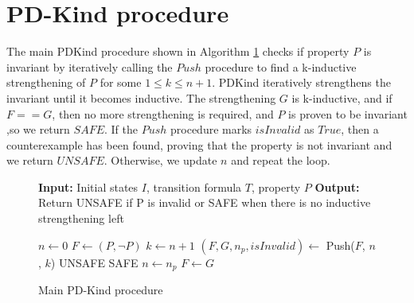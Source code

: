 \newpage
\section{PD-Kind procedure}

\noindent The main PDKind procedure shown in Algorithm \ref{alg:4}
checks if property \( P \) is invariant by
iteratively calling the \( Push \) procedure to find a k-inductive
strengthening of \( P \) for some $1 \leq k \leq n + 1$.
PDKind iteratively strengthens the invariant until it becomes inductive.
The strengthening
\( G \) is k-inductive, and if $F == G$, then no more strengthening is required, and \( P \) is proven to be invariant
,so we return \( SAFE \). If the \( Push \) procedure marks
\( isInvalid \) as \( True \), then a counterexample has been found, proving that the property is not invariant and we
return \( UNSAFE \). Otherwise, we update \( n \) and repeat the loop.


\begin{figure}[H]
\begin{mdframed}
\begin{algorithmic}[1]
\State \textbf{Input:} Initial states $I$, transition formula $T$, property $P$
\State \textbf{Output:} Return UNSAFE if P is invalid or SAFE when there is no inductive strengthening left

\State $n \gets 0$
    \State $F \gets (P, \neg P)$
        \State $k \gets n + 1$
        \State $(F, G, n_p, isInvalid) \gets$ Push($F$, $n$, $k$)
        \State \Return UNSAFE
        \EndIf
        \State \Return SAFE
        \EndIf
        \State $n \gets n_p$
        \State $F \gets G$
    \EndWhile

\end{algorithmic}
\end{mdframed}
\caption{Main PD-Kind procedure}\label{alg:4}
\end{figure}

